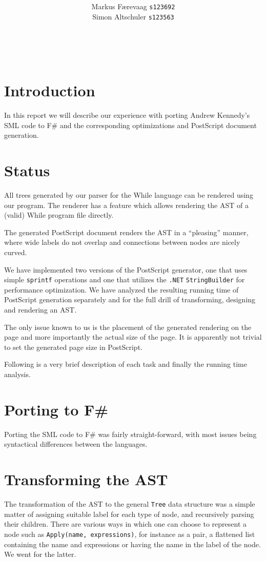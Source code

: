 \documentclass{article}
\title{\TITLE\\ {\large \COURSE}}
\date{\DATE}
\author{
  Markus Færevaag {\tt s123692}\\
  Simon Altschuler {\tt s123563}
}
\begin{document}
\maketitle
\vspace{10cm}
 \\
\clearpage


\section{Introduction}
In this report we will describe our experience with porting Andrew Kennedy's SML code to F\# and the corresponding optimizations and PostScript document generation.


\section{Status}
All trees generated by our parser for the While language can be rendered using our program. The renderer has a feature which allows rendering the AST of a (valid) While program file directly.

The generated PostScript document renders the AST in a ``pleasing'' manner, where wide labels do not overlap and connections between nodes are nicely curved.

We have implemented two versions of the PostScript generator, one that uses simple \texttt{sprintf} operations and one that utilizes the \texttt{.NET} \texttt{StringBuilder} for performance optimization. We have analyzed the resulting running time of PostScript generation separately and for the full drill of transforming, designing and rendering an AST.

The only issue known to us is the placement of the generated rendering on the page and more importantly the actual size of the page. It is apparently not trivial to set the generated page size in PostScript.

Following is a very brief description of each task and finally the running time analysis.


\section{Porting to F\#}
Porting the SML code to F\# was fairly straight-forward, with most issues being syntactical differences between the languages.


\section{Transforming the AST}
The transformation of the AST to the general \texttt{Tree} data structure was a simple matter of assigning suitable label for each type of node, and recursively parsing their children. There are various ways in which one can choose to represent a node such as \texttt{Apply(name, expressions)}, for instance as a pair, a flattened list containing the name and expressions or having the name in the label of the node. We went for the latter.
\end{document}
